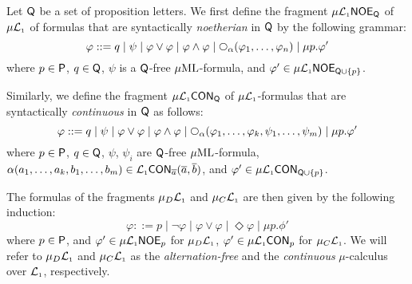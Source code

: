 \begin{definition}
Let $\mathsf{Q}$ be a set  of proposition letters.
We first define the fragment $\mu\mathcal{L}_{\scriptscriptstyle 1}\mathsf{NOE}_{\mathsf{Q}}$ of $\mu\mathcal{L}_{\scriptscriptstyle 1}$ of 
formulas that are syntactically \emph{noetherian} in $\mathsf{Q}$ by the following 
grammar:
\begin{equation*}
   \varphi ::= q
   \mid \psi
   \mid \varphi \lor \varphi
   \mid \varphi \land \varphi
   \mid \nxt{\al}(\varphi_{1},\ldots,\varphi_{n})
   \mid \mu p.\phi'
\end{equation*}
where $p\in\mathsf{P}$, $q \in \mathsf{Q}$, $\psi$ is a $\mathsf{Q}$-free $\mu\mathrm{ML}$-formula,
and $\varphi' \in \mu\mathcal{L}_{\scriptscriptstyle 1}\mathsf{NOE}_{\mathsf{Q}\cup\{p\}}$. 

Similarly, we define the fragment $\mu\mathcal{L}_{\scriptscriptstyle 1}\mathsf{CON}_{\mathsf{Q}}$ of 
$\mu\mathcal{L}_{\scriptscriptstyle 1}$-formulas that are syntactically \emph{continuous} in $\mathsf{Q}$ as
follows:
\begin{equation*}
   \varphi ::= q
   \mid \psi
   \mid \varphi \lor \varphi
   \mid \varphi \land \varphi
   \mid 
   \nxt{\al}(\varphi_{1},\ldots,\varphi_{k},\psi_{1},\ldots,\psi_{m})
   \mid \mu p.\phi'
\end{equation*}
where $p\in\mathsf{P}$, $q \in \mathsf{Q}$, $\psi$, $\psi_{i}$ are $\mathsf{Q}$-free 
$\mu\mathrm{ML}$-formula, $\alpha(a_{1},\ldots,a_{k},b_{1},\ldots,b_{m}) \in 
\mathcal{L}_{\scriptscriptstyle 1}\mathsf{CON}_{\overline{a}}(\overline{a},\overline{b})$,
and $\varphi' \in \mu\mathcal{L}_{\scriptscriptstyle 1}\mathsf{CON}_{\mathsf{Q}\cup\{p\}}$. 

The formulas of the fragments $\mu_{D}\mathcal{L}_{\scriptscriptstyle 1}$ and $\mu_{C}\mathcal{L}_{\scriptscriptstyle 1}$ are then given
by the following induction:
\begin{equation*}
   \varphi ::= p \mid \lnot \varphi
    \mid \varphi \lor \varphi
    \mid  \Diamond \varphi
    \mid \mu p.\phi'
\end{equation*}
where $p \in \mathsf{P}$, and $\varphi' \in \mu\mathcal{L}_{\scriptscriptstyle 1}\mathsf{NOE}_{p}$ for $\mu_{D}\mathcal{L}_{\scriptscriptstyle 1}$,
$\varphi' \in \mu\mathcal{L}_{\scriptscriptstyle 1}\mathsf{CON}_{p}$ for $\mu_{C}\mathcal{L}_{\scriptscriptstyle 1}$.
We will refer to $\mu_{D}\mathcal{L}_{\scriptscriptstyle 1}$ and $\mu_{C}\mathcal{L}_{\scriptscriptstyle 1}$ as the 
\emph{alternation-free} and the \emph{continuous} $\mu$-calculus over $\mathcal{L}_{\scriptscriptstyle 1}$,
respectively.
\end{definition}

